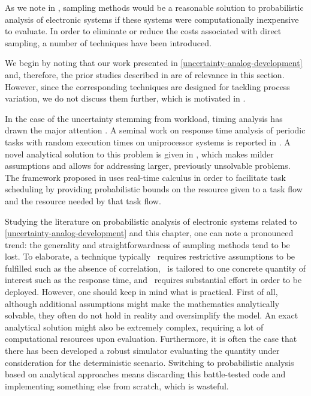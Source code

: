 As we note in , sampling methods would be a reasonable solution to
probabilistic analysis of electronic systems if these systems were
computationally inexpensive to evaluate. In order to eliminate or reduce the
costs associated with direct sampling, a number of techniques have been
introduced.

We begin by noting that our work presented in
\cref{uncertainty-analog-development} and, therefore, the prior studies
described in  are of relevance in this section. However, since
the corresponding techniques are designed for tackling process variation, we do
not discuss them further, which is motivated in .

In the case of the uncertainty stemming from workload, timing analysis has drawn
the major attention \cite{quinton2012}. A seminal work on response time analysis
of periodic tasks with random execution times on uniprocessor systems is
reported in \cite{diaz2002}. A novel analytical solution to this problem is
given in \cite{tanasa2015}, which makes milder assumptions and allows for
addressing larger, previously unsolvable problems. The framework proposed in
\cite{santinelli2011} uses real-time calculus in order to facilitate task
scheduling by providing probabilistic bounds on the resource given to a task
flow and the resource needed by that task flow.

Studying the literature on probabilistic analysis of electronic systems related
to \cref{uncertainty-analog-development} and this chapter, one can note a
pronounced trend: the generality and straightforwardness of sampling methods
tend to be lost. To elaborate, a technique typically \one~requires restrictive
assumptions to be fulfilled such as the absence of correlation, \two~is tailored
to one concrete quantity of interest such as the response time, and
\three~requires substantial effort in order to be deployed. However, one should
keep in mind what is practical. First of all, although additional assumptions
might make the mathematics analytically solvable, they often do not hold in
reality and oversimplify the model. An exact analytical solution might also be
extremely complex, requiring a lot of computational resources upon evaluation.
Furthermore, it is often the case that there has been developed a robust
simulator evaluating the quantity under consideration for the deterministic
scenario. Switching to probabilistic analysis based on analytical approaches
means discarding this battle-tested code and implementing something else from
scratch, which is wasteful.

